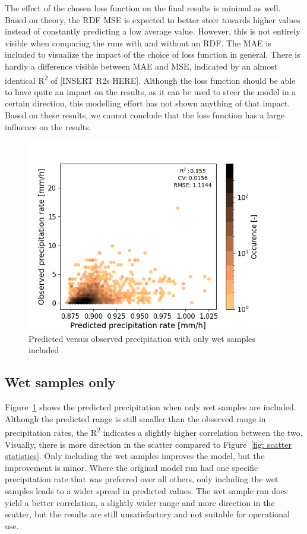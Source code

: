 \documentclass[twocolumn, 10pt, a4paper]{memoir}
\begin{document}
	The effect of the chosen loss function on the final results is minimal as well. Based on theory, the RDF MSE is expected to better steer towards higher values instead of constantly predicting a low average value. However, this is not entirely visible when comparing the runs with and without an RDF. The MAE is included to visualize the impact of the choice of loss function in general. There is hardly a difference visible between MAE and MSE, indicated by an almost identical R\textsuperscript{2} of [INSERT R2s HERE]. Although the loss function should be able to have quite an impact on the results, as it can be used to steer the model in a certain direction, this modelling effort has not shown anything of that impact. Based on these results, we cannot conclude that the loss function has a large influence on the results.

	\begin{figure}
		\includegraphics[width=\columnwidth]{scatter_onlyRain_final}
		\caption{Predicted versus observed precipitation with only wet samples included}
		\label{fig: onlyrain scatter}
	\end{figure}
	
	\subsection*{Wet samples only}
	Figure~\ref{fig: onlyrain scatter} shows the predicted precipitation when only wet samples are included. Although the predicted range is still smaller than the observed range in precipitation rates, the R\textsuperscript{2} indicates a slightly higher correlation between the two. Visually, there is more direction in the scatter compared to Figure~\ref{fig: scatter statistics}. Only including the wet samples improves the model, but the improvement is minor. Where the original model run had one specific precipitation rate that was preferred over all others, only including the wet samples leads to a wider spread in predicted values. The wet sample run does yield a better correlation, a slightly wider range and more direction in the scatter, but the results are still unsatisfactory and not suitable for operational use. 
	
\end{document}
